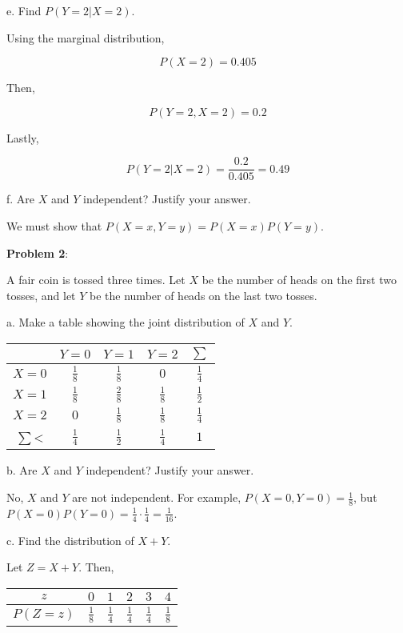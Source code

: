 \documentclass{article}
\begin{document}
\indent e. Find $P(Y=2|X=2)$.

{\color{blue}

Using the marginal distribution, 

\[P(X=2)=0.405\]

Then, 

\[P(Y=2,X=2)=0.2\]

Lastly,

\[P(Y=2|X=2)=\frac{0.2}{0.405}=0.49\]

}

\indent f. Are $X$ and $Y$ independent? Justify your answer.

We must show that $P(X=x,Y=y)=P(X=x)P(Y=y)$.

\noindent\textbf{Problem 2}: 

A fair coin is tossed three times. Let $X$ be the number of heads on the first two tosses, and let $Y$ be the number of heads on the last two tosses.

\indent\indent a. Make a table showing the joint distribution of $X$ and $Y$.

{\color{blue}

\begin{center}
    \begin{tabular} { |c|c|c|c||c|}
        \hline
        &$Y=0$&$Y=1$&$Y=2$&$\sum$\\
        \hline
        $X=0$&$\frac{1}{8}$&$\frac{1}{8}$&$0$&$\frac{1}{4}$\\
        \hline
        $X=1$&$\frac{1}{8}$&$\frac{2}{8}$&$\frac{1}{8}$&$\frac{1}{2}$\\
        \hline
        $X=2$&$0$&$\frac{1}{8}$&$\frac{1}{8}$&$\frac{1}{4}$\\
        \hline
        \hline
        $\sum$<&$\frac{1}{4}$&$\frac{1}{2}$&$\frac{1}{4}$&$1$\\
        \hline
    \end{tabular}
\end{center}

}

\indent\indent b. Are $X$ and $Y$ independent? Justify your answer.

{\color{blue}

No, $X$ and $Y$ are not independent. For example, $P(X=0,Y=0)=\frac{1}{8}$, but $P(X=0)P(Y=0)=\frac{1}{4}\cdot\frac{1}{4}=\frac{1}{16}$.

}

\indent\indent c. Find the distribution of $X+Y$.

{\color{blue}

Let $Z=X+Y$. Then,

\begin{center}
    \begin{tabular} { |c|c|c|c|c|c|}
        \hline
        $z$&$0$&$1$&$2$&$3$&$4$\\
        \hline
        $P(Z=z)$&$\frac{1}{8}$&$\frac{1}{4}$&$\frac{1}{4}$&$\frac{1}{4}$&$\frac{1}{8}$\\
        \hline
    \end{tabular}
\end{center}

}
\end{document}
